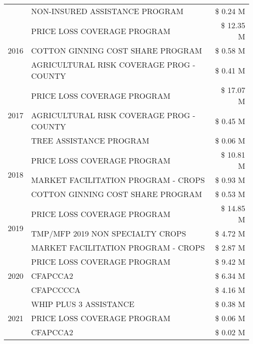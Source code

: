 \begin{tabular}{llr}
 & NON-INSURED ASSISTANCE PROGRAM & \$ 0.24 M \\
\cline{1-3}
\multirow[t]{3}{*}{2016} & PRICE LOSS COVERAGE PROGRAM & \$ 12.35 M \\
 & COTTON GINNING COST SHARE PROGRAM & \$ 0.58 M \\
 & AGRICULTURAL RISK COVERAGE PROG - COUNTY & \$ 0.41 M \\
\cline{1-3}
\multirow[t]{3}{*}{2017} & PRICE LOSS COVERAGE PROGRAM & \$ 17.07 M \\
 & AGRICULTURAL RISK COVERAGE PROG - COUNTY & \$ 0.45 M \\
 & TREE ASSISTANCE PROGRAM & \$ 0.06 M \\
\cline{1-3}
\multirow[t]{3}{*}{2018} & PRICE LOSS COVERAGE PROGRAM & \$ 10.81 M \\
 & MARKET FACILITATION PROGRAM - CROPS & \$ 0.93 M \\
 & COTTON GINNING COST SHARE PROGRAM & \$ 0.53 M \\
\cline{1-3}
\multirow[t]{3}{*}{2019} & PRICE LOSS COVERAGE PROGRAM & \$ 14.85 M \\
 & TMP/MFP 2019 NON SPECIALTY CROPS & \$ 4.72 M \\
 & MARKET FACILITATION PROGRAM - CROPS & \$ 2.87 M \\
\cline{1-3}
\multirow[t]{3}{*}{2020} & PRICE LOSS COVERAGE PROGRAM & \$ 9.42 M \\
 & CFAPCCA2 & \$ 6.34 M \\
 & CFAPCCCCA & \$ 4.16 M \\
\cline{1-3}
\multirow[t]{3}{*}{2021} & WHIP PLUS 3 ASSISTANCE & \$ 0.38 M \\
 & PRICE LOSS COVERAGE PROGRAM & \$ 0.06 M \\
 & CFAPCCA2 & \$ 0.02 M \\
\cline{1-3}
\bottomrule
\end{tabular}

